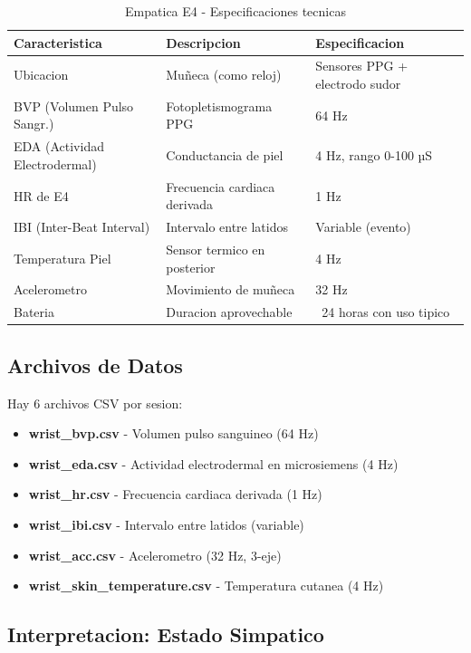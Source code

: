 \begin{table}[H]
\centering
\caption{Empatica E4 - Especificaciones tecnicas}
\begin{tabular}{|p{3.5cm}|p{4cm}|p{3cm}|}
\hline
\textbf{Caracteristica} & \textbf{Descripcion} & \textbf{Especificacion} \\
\hline
Ubicacion & Muñeca (como reloj) & Sensores PPG + electrodo sudor \\
\hline
BVP (Volumen Pulso Sangr.) & Fotopletismograma PPG & 64 Hz \\
\hline
EDA (Actividad Electrodermal) & Conductancia de piel & 4 Hz, rango 0-100 µS \\
\hline
HR de E4 & Frecuencia cardiaca derivada & 1 Hz \\
\hline
IBI (Inter-Beat Interval) & Intervalo entre latidos & Variable (evento) \\
\hline
Temperatura Piel & Sensor termico en posterior & 4 Hz \\
\hline
Acelerometro & Movimiento de muñeca & 32 Hz \\
\hline
Bateria & Duracion aprovechable & ~24 horas con uso tipico \\
\hline
\end{tabular}
\end{table}

\subsection{Archivos de Datos}

Hay 6 archivos CSV por sesion:

\begin{itemize}
    \item \textbf{wrist\_bvp.csv} - Volumen pulso sanguineo (64 Hz)
    \item \textbf{wrist\_eda.csv} - Actividad electrodermal en microsiemens (4 Hz)
    \item \textbf{wrist\_hr.csv} - Frecuencia cardiaca derivada (1 Hz)
    \item \textbf{wrist\_ibi.csv} - Intervalo entre latidos (variable)
    \item \textbf{wrist\_acc.csv} - Acelerometro (32 Hz, 3-eje)
    \item \textbf{wrist\_skin\_temperature.csv} - Temperatura cutanea (4 Hz)
\end{itemize}

\subsection{Interpretacion: Estado Simpatico}

